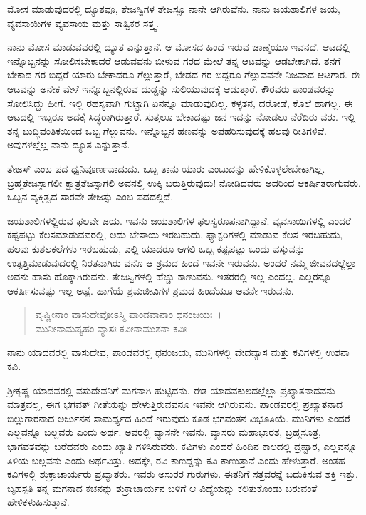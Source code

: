{\small ಮೋಸ ಮಾಡುವುದರಲ್ಲಿ ದ್ಯೂತವೂ, ತೇಜಸ್ವಿಗಳ ತೇಜಸ್ಸೂ ನಾನೇ ಆಗಿರುವೆನು. ನಾನು ಜಯಶಾಲಿಗಳ ಜಯ, ವ್ಯವಸಾಯಿಗಳ ವ್ಯವಸಾಯ ಮತ್ತು ಸಾತ್ವಿಕರ ಸತ್ತ್ವ.}

ನಾನು ಮೋಸ ಮಾಡುವವರಲ್ಲಿ ದ್ಯೂತ ಎನ್ನುತ್ತಾನೆ. ಆ ಮೋಸದ ಹಿಂದೆ ಇರುವ ಜಾಣ್ಮೆಯೂ ಇವನದೆ. ಆಟದಲ್ಲಿ ಇನ್ನೊಬ್ಬನನ್ನು ಸೋಲಿಸಬೇಕಾದರೆ ಆಡುವವನು ಬೀಳುವ ಗರದ ಮೇಲೆ ತನ್ನ ಆಟವನ್ನು ಆಡಬೇಕಾಗಿದೆ. ತನಗೆ ಬೇಕಾದ ಗರ ಬಿದ್ದರೆ ಯಾರು ಬೇಕಾದರೂ ಗೆಲ್ಲುತ್ತಾರೆ, ಬೇಡದ ಗರ ಬಿದ್ದರೂ ಗೆಲ್ಲುವವನೇ ನಿಜವಾದ ಆಟಗಾರ. ಈ ಆಟವನ್ನು ಅನೇಕ ವೇಳೆ ಇನ್ನೊಬ್ಬನಲ್ಲಿರುವ ದುಡ್ಡನ್ನು ಸುಲಿಯುವುದಕ್ಕೆ ಆಡುತ್ತಾರೆ. ಕೌರವರು ಪಾಂಡವರನ್ನು ಸೋಲಿಸಿದ್ದು ಹೀಗೆ. ಇಲ್ಲಿ ರಹಸ್ಯವಾಗಿ ಗುಟ್ಟಾಗಿ ಏನನ್ನೂ ಮಾಡುವುದಿಲ್ಲ. ಕಳ್ಳತನ, ದರೋಡೆ, ಕೊಲೆ ಹಾಗಲ್ಲ. ಈ ಆಟದಲ್ಲಿ ಇಬ್ಬರೂ ಅದಕ್ಕೆ ಸಿದ್ಧರಾಗಿರುತ್ತಾರೆ. ಸುತ್ತಲೂ ಬೇಕಾದಷ್ಟು ಜನ ಇದನ್ನು ನೋಡಲು ನೆರೆದಿರು ವರು. ಇಲ್ಲಿ ತನ್ನ ಬುದ್ಧಿವಂತಿಕಯಿಂದ ಒಬ್ಬ ಗೆಲ್ಲುವನು. ಇನ್ನೊಬ್ಬನ ಹಣವನ್ನು ಅಪಹರಿಸುವುದಕ್ಕೆ ಹಲವು ರೀತಿಗಳಿವೆ. ಅವುಗಳಲ್ಲೆಲ್ಲ ನಾನು ದ್ಯೂತ ಎನ್ನುತ್ತಾನೆ. 

ತೇಜಸ್ ಎಂಬ ಪದ ಧ್ವನಿವೂರ್ಣವಾದುದು. ಒಬ್ಬ ತಾನು ಯಾರು ಎಂಬುದನ್ನು ಹೇಳಿಕೊಳ್ಳಲೇಬೇಕಾಗಿಲ್ಲ. ಬ್ರಹ್ಮತೇಜಸ್ಸಾಗಲೀ ಕ್ಷಾತ್ರತೆಜಸ್ಸಾಗಲಿ ಅವನಲ್ಲಿ ಉಕ್ಕಿ ಬರುತ್ತಿರುವುದು! ನೋಡಿದವರು ಅದರಿಂದ ಆಕರ್ಷಿತರಾಗುವರು. ಒಬ್ಬನ ವ್ಯಕ್ತಿತ್ವದ ಸಾರವೇ ತೇಜಸ್ಸು ಎಂಬ ಪದದಲ್ಲಿದೆ. 

ಜಯಶಾಲಿಗಳಲ್ಲಿರುವ ಫಲವೇ ಜಯ. ಇವನು ಜಯಶಾಲಿಗಳ ಫಲಸ್ವರೂಪನಾಗಿದ್ದಾನೆ. ವ್ಯವಸಾಯಿಗಳಲ್ಲಿ ಎಂದರೆ ಕಷ್ಟಪಟ್ಟು ಕೆಲಸಮಾಡುವವರಲ್ಲಿ, ಅದು ಬೇಸಾಯ ಇರಬಹುದು, ಫ್ಯಾಕ್ಟರಿಗಳಲ್ಲಿ ಮಾಡುವ ಕೆಲಸ ಇರಬಹುದು, ಹಲವು ಕುಶಲಕಲೆಗಳು ಇರಬಹುದು, ಎಲ್ಲಿ ಯಾದರೂ ಆಗಲಿ ಒಬ್ಬ ಕಷ್ಟಪಟ್ಟು ಒಂದು ವಸ್ತುವನ್ನು ಉತ್ಪತ್ತಿಮಾಡುವುದರಲ್ಲಿ ನಿರತನಾಗಿರು ವನೊ ಆ ಶ್ರಮದ ಹಿಂದೆ ಇವನೇ ಇರುವನು. ಅಂದರೆ ನಮ್ಮ ಜೀವನದಲ್ಲೆಲ್ಲಾ ಅವನು ಹಾಸು ಹೊಕ್ಕಾಗಿರುವನು. ತೇಜಸ್ವಿಗಳಲ್ಲಿ ಹೆಚ್ಚು ಕಾಣುವನು. ಇತರರಲ್ಲಿ ಇಲ್ಲ ಎಂದಲ್ಲ. ಎಲ್ಲರನ್ನೂ ಆಕರ್ಷಿಸುವಷ್ಟು ಇಲ್ಲ ಅಷ್ಟೆ. ಹಾಗೆಯೆ ಶ್ರಮಜೀವಿಗಳ ಶ್ರಮದ ಹಿಂದೆಯೂ ಅವನೇ ಇರುವನು.

\begin{verse}
ವೃಷ್ಣೀನಾಂ ವಾಸುದೇವೋಽಸ್ಮಿ ಪಾಂಡವಾನಾಂ ಧನಂಜಯಃ~।\\ಮುನೀನಾಮಪ್ಯಹಂ ವ್ಯಾಸಃ ಕವೀನಾಮುಶನಾ ಕವಿಃ 
\end{verse}

{\small ನಾನು ಯಾದವರಲ್ಲಿ ವಾಸುದೇವ, ಪಾಂಡವರಲ್ಲಿ ಧನಂಜಯ, ಮುನಿಗಳಲ್ಲಿ ವೇದವ್ಯಾಸ ಮತ್ತು ಕವಿಗಳಲ್ಲಿ ಉಶನಾ ಕವಿ.}

ಶ‍್ರೀಕೃಷ್ಣ ಯಾದವರಲ್ಲಿ ವಸುದೇವನಿಗೆ ಮಗನಾಗಿ ಹುಟ್ಟಿದನು. ಈತ ಯಾದವಕುಲದಲ್ಲೆಲ್ಲಾ ಪ್ರಖ್ಯಾತನಾದವನು ಮಾತ್ರವಲ್ಲ, ಈಗ ಭಗವತ್ ಗೀತೆಯನ್ನು ಹೇಳುತ್ತಿರುವವನೂ ಇವನೇ ಆಗಿರುವನು. ಪಾಂಡವರಲ್ಲಿ ಪ್ರಖ್ಯಾತನಾದ ಬಿಲ್ಲುಗಾರನಾದ ಅರ್ಜುನನ ಸಾಮರ್ಥ್ಯದ ಹಿಂದೆ ಇರುವುದು ಕೂಡ ಭಗವಂತನ ವಿಭೂತಿಯೆ. ಮುನಿಗಳು ಎಂದರೆ ಎಲ್ಲವನ್ನೂ ಬಲ್ಲವರು ಎಂದು ಅರ್ಥ. ಅವರಲ್ಲಿ ವ್ಯಾಸನೇ ಇವನು. ವ್ಯಾಸರು ಮಹಾಭಾರತ, ಬ್ರಹ್ಮಸೂತ್ರ, ಭಾಗವತವನ್ನು ಬರೆದವರು ಎಂದು ಖ್ಯಾತಿ ಗಳಿಸಿರುವರು. ಕವಿಗಳು ಎಂದರೆ ಹಿಂದಿನ ಕಾಲದಲ್ಲಿ ದ್ರಷ್ಟಾರ, ಎಲ್ಲವನ್ನೂ ತಿಳಿಯ ಬಲ್ಲವನು ಎಂದು ಅರ್ಥವಿತ್ತು. ಅದಕ್ಕೇ, ರವಿ ಕಾಣದ್ದನ್ನು ಕವಿ ಕಾಣುತ್ತಾನೆ ಎಂದು ಹೇಳುತ್ತಾರೆ. ಅಂತಹ ಕವಿಗಳಲ್ಲಿ ಶುಕ್ರಾಚಾರ್ಯರು ಪ್ರಖ್ಯಾತರು. ಇವರು ಅಸುರರ ಗುರುಗಳು. ಈತನಿಗೆ ಸತ್ತವರನ್ನೆ ಬದುಕಿಸುವ ಶಕ್ತಿ ಇತ್ತು. ಬೃಹಸ್ಪತಿ ತನ್ನ ಮಗನಾದ ಕಚನನ್ನು ಶುಕ್ರಾಚಾರ್ಯನ ಬಳಿಗೆ ಆ ವಿದ್ಯೆಯನ್ನು ಕಲಿತುಕೊಂಡು ಬರುವಂತೆ ಹೇಳಿಕಳುಹಿಸುತ್ತಾನೆ.

